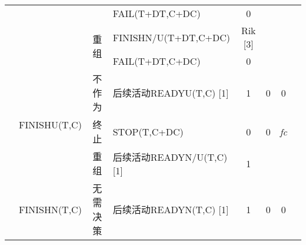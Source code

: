 \begin{table}[htbp]
\begin{tabular}{rrrrrrrr}
        \multicolumn{1}{c}{} &       & \multicolumn{1}{c}{} & \multicolumn{1}{l}{FAIL(T+DT,C+DC)} & \multicolumn{1}{c}{0} & \multicolumn{1}{c}{} & \multicolumn{1}{c}{} \\
        \multicolumn{1}{c}{} &       & \multicolumn{1}{c}{\multirow{2}[4]{*}{重组}} & \multicolumn{1}{l}{FINISHN/U(T+DT,C+DC)} & \multicolumn{1}{c}{Rik  [3]} & \multirow{2}[4]{*}{\textit{}} & \multirow{2}[4]{*}{\textit{}} \\
        \multicolumn{1}{c}{} &       & \multicolumn{1}{c}{} & \multicolumn{1}{l}{FAIL(T+DT,C+DC)} & \multicolumn{1}{c}{0} &       &  \\
        \multicolumn{1}{c}{} & \multirow{3}[6]{*}{FINISHU(T,C)} & \multicolumn{1}{c}{不作为} & \multicolumn{1}{l}{后续活动READYU(T,C) [1]} & \multicolumn{1}{c}{1} & \multicolumn{1}{c}{0} & \multicolumn{1}{c}{0} \\
        \multicolumn{1}{c}{} &       & \multicolumn{1}{c}{终止} & \multicolumn{1}{l}{STOP(T,C+DC)} & \multicolumn{1}{c}{0} & \multicolumn{1}{c}{0} & \multicolumn{1}{c}{\textit{fc}} \\
        \multicolumn{1}{c}{} &       & \multicolumn{1}{c}{重组} & \multicolumn{1}{l}{后续活动READYN/U(T,C) [1]} & \multicolumn{1}{c}{1} &       & \textit{} \\
        \multicolumn{1}{c}{} & FINISHN(T,C) & \multicolumn{1}{c}{无需决策} & \multicolumn{1}{l}{后续活动READYN(T,C) [1]} & \multicolumn{1}{c}{1} & \multicolumn{1}{c}{0} & \multicolumn{1}{c}{0} \\
            \bottomrule
        \end{tabular}%
        \label{tab:addlabel}%
    \end{table}%
    



